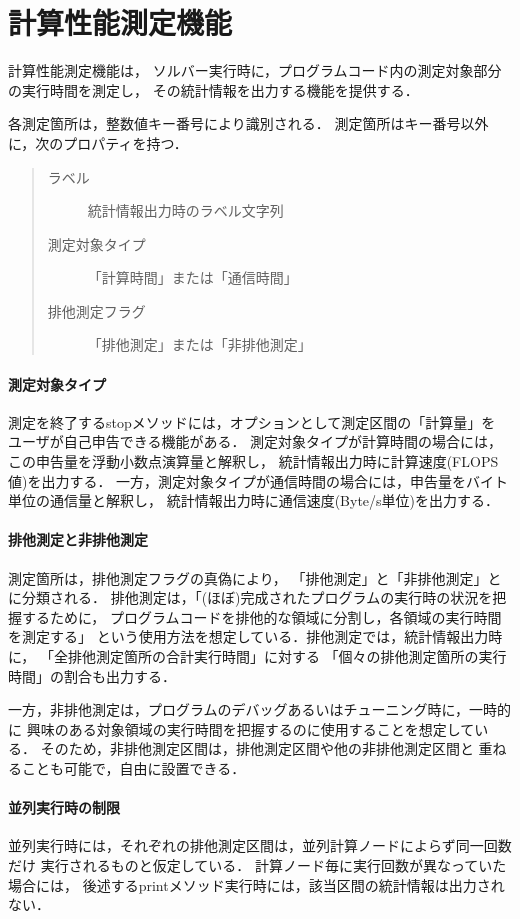 \graphicspath{{./fig_PM/}}
%

\section{計算性能測定機能}
計算性能測定機能は，
ソルバー実行時に，プログラムコード内の測定対象部分の実行時間を測定し，
その統計情報を出力する機能を提供する．

各測定箇所は，整数値キー番号により識別される．
測定箇所はキー番号以外に，次のプロパティを持つ．
\begin{quote}
\begin{description}
\item[ラベル] 統計情報出力時のラベル文字列
\item[測定対象タイプ] 「計算時間」または「通信時間」
\item[排他測定フラグ] 「排他測定」または「非排他測定」
\end{description}
\end{quote}

\paragraph{測定対象タイプ}
測定を終了するstopメソッドには，オプションとして測定区間の「計算量」を
ユーザが自己申告できる機能がある．
測定対象タイプが計算時間の場合には，この申告量を浮動小数点演算量と解釈し，
統計情報出力時に計算速度(FLOPS値)を出力する．
一方，測定対象タイプが通信時間の場合には，申告量をバイト単位の通信量と解釈し，
統計情報出力時に通信速度(Byte/s単位)を出力する．

\paragraph{排他測定と非排他測定}
測定箇所は，排他測定フラグの真偽により，
「排他測定」と「非排他測定」とに分類される．
排他測定は，「(ほぼ)完成されたプログラムの実行時の状況を把握するために，
プログラムコードを排他的な領域に分割し，各領域の実行時間を測定する」
という使用方法を想定している．排他測定では，統計情報出力時に，
「全排他測定箇所の合計実行時間」に対する
「個々の排他測定箇所の実行時間」の割合も出力する．

一方，非排他測定は，プログラムのデバッグあるいはチューニング時に，一時的に
興味のある対象領域の実行時間を把握するのに使用することを想定している．
そのため，非排他測定区間は，排他測定区間や他の非排他測定区間と
重ねることも可能で，自由に設置できる．

\paragraph{並列実行時の制限}
並列実行時には，それぞれの排他測定区間は，並列計算ノードによらず同一回数だけ
実行されるものと仮定している．
計算ノード毎に実行回数が異なっていた場合には，
後述するprintメソッド実行時には，該当区間の統計情報は出力されない．

